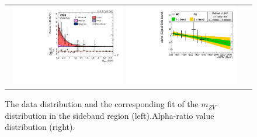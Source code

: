 \begin{figure}[htbp] 
	 \centering 
	 \begin{tabular}{cc}
	 \includegraphics[width=0.48\textwidth]{Plots/BackgroundEstimation/ZV/m_lvj_fitting/m_lvj_sb_lo_WJets0_xww__with_pull.pdf}
	 \includegraphics[width=0.48\textwidth]{Plots/BackgroundEstimation/ZV/ZVchannel_AlphaDistribution_AfterFit.pdf}
	 \end{tabular}
	 \caption{The data distribution and the corresponding fit of the $m_{ZV}$ distribution in the sideband region (left).Alpha-ratio value distribution (right).}
	 \label{fig:zvfits}
\end{figure}
